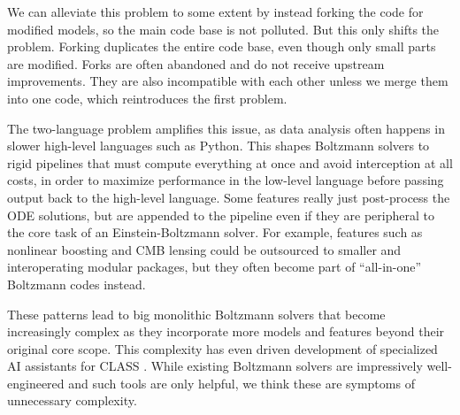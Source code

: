 \documentclass{aa}
\begin{document}
We can alleviate this problem to some extent by instead forking the code for modified models, so the main code base is not polluted.
But this only shifts the problem.
Forking duplicates the entire code base, even though only small parts are modified.
Forks are often abandoned and do not receive upstream improvements.
They are also incompatible with each other unless we merge them into one code, which reintroduces the first problem.

The two-language problem amplifies this issue, as data analysis often happens in slower high-level languages such as Python.
This shapes Boltzmann solvers to rigid pipelines that must compute everything at once and avoid interception at all costs, in order to maximize performance in the low-level language before passing output back to the high-level language.
Some features really just post-process the ODE solutions, but are appended to the pipeline even if they are peripheral to the core task of an Einstein-Boltzmann solver.
For example, features such as nonlinear boosting and CMB lensing could be outsourced to smaller and interoperating modular packages, but they often become part of \enquote{all-in-one} Boltzmann codes instead.

These patterns lead to big monolithic Boltzmann solvers
that become increasingly complex as they incorporate more models and features beyond their original core scope.
This complexity has even driven development of specialized AI assistants for CLASS \citep{casasCLAPPCLASSLLM2025}.
While existing Boltzmann solvers are impressively well-engineered and such tools are only helpful, we think these are symptoms of unnecessary complexity.
\end{document}
